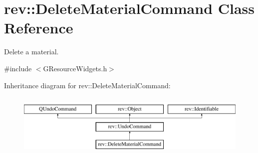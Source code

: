 \hypertarget{classrev_1_1_delete_material_command}{}\section{rev\+::Delete\+Material\+Command Class Reference}
\label{classrev_1_1_delete_material_command}


Delete a material.  




{\ttfamily \#include $<$G\+Resource\+Widgets.\+h$>$}

Inheritance diagram for rev\+::Delete\+Material\+Command\+:\begin{figure}[H]
\begin{center}
\leavevmode
\includegraphics[height=3.000000cm]{classrev_1_1_delete_material_command}
\end{center}
\end{figure}
